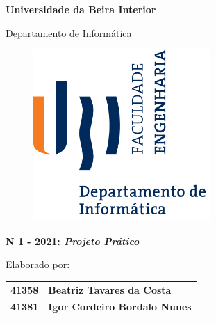 
\thispagestyle{empty}
\setcounter{page}{-1}

\begin{center}
\begin{Huge}
\textbf{Universidade da Beira Interior}
\end{Huge}
\end{center}

\begin{center}
\begin{Huge}
Departamento de Informática
\end{Huge}
\end{center}

\vspace{0,07cm}
\begin{figure}[!htb]
\centering
\includegraphics[width=191pt]{ubi-fe-di.png}
\end{figure}

\vspace{0.5cm}
\begin{center}
\begin{Large}
\textbf{N\textordmasculine{} 1 - 2021: \emph{Projeto Prático}}
\end{Large}
\end{center}


\vspace{0.5cm}
\begin{center}
\begin{normalsize}
\begin{large}
Elaborado por:
\end{large}
\end{normalsize}
\end{center}

\vspace{0.2cm}
\begin{center}
\begin{large}
\begin{tabular}{>{\bfseries}r @{~~---~~} >{\bfseries}l}
	41358 & Beatriz Tavares da Costa    \\
	41381 & Igor Cordeiro Bordalo Nunes
\end{tabular}
\end{large}
\end{center}

